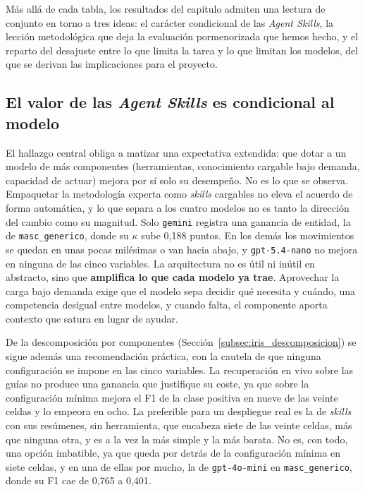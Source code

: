 
Más allá de cada tabla, los resultados del capítulo admiten una lectura de conjunto
en torno a tres ideas: el carácter condicional de las \textit{Agent Skills}, la
lección metodológica que deja la evaluación pormenorizada que hemos hecho, y el
reparto del desajuste entre lo que limita la tarea y lo que limitan los modelos, del
que se derivan las implicaciones para el proyecto.

\subsection{El valor de las \textit{Agent Skills} es condicional al modelo}

El hallazgo central obliga a matizar una expectativa extendida: que dotar a un modelo
de más componentes (herramientas, conocimiento cargable bajo demanda, capacidad de
actuar) mejora por sí solo su desempeño. No es lo que se observa. Empaquetar la
metodología experta como \textit{skills} cargables no eleva el acuerdo de forma
automática, y lo que separa a los cuatro modelos no es tanto la dirección del cambio
como su magnitud. Solo \texttt{gemini} registra una ganancia de entidad, la de
\texttt{masc\_generico}, donde su $\kappa$ sube 0,188 puntos. En los demás los
movimientos se quedan en unas pocas milésimas o van hacia abajo, y
\texttt{gpt-5.4-nano} no mejora en ninguna de las cinco variables. La arquitectura no
es útil ni inútil en abstracto, sino que \textbf{amplifica lo que cada modelo ya
trae}. Aprovechar la carga bajo demanda exige que el modelo sepa decidir qué necesita
y cuándo, una competencia desigual entre modelos, y cuando falta, el componente aporta
contexto que satura en lugar de ayudar.

De la descomposición por componentes (Sección~\ref{subsec:iris_descomposicion}) se
sigue además una recomendación práctica, con la cautela de que ninguna configuración
se impone en las cinco variables. La recuperación en vivo sobre las guías no produce
una ganancia que justifique su coste, ya que sobre la configuración mínima mejora el
F1 de la clase positiva en nueve de las veinte celdas y lo empeora en ocho. La
preferible para un despliegue real es la de \textit{skills} con sus resúmenes, sin
herramienta, que encabeza siete de las veinte celdas, más que ninguna otra, y es a la
vez la más simple y la más barata. No es, con todo, una opción imbatible, ya que queda
por detrás de la configuración mínima en siete celdas, y en una de ellas por mucho, la
de \texttt{gpt-4o-mini} en \texttt{masc\_generico}, donde su F1 cae de 0,765 a
0,401.

